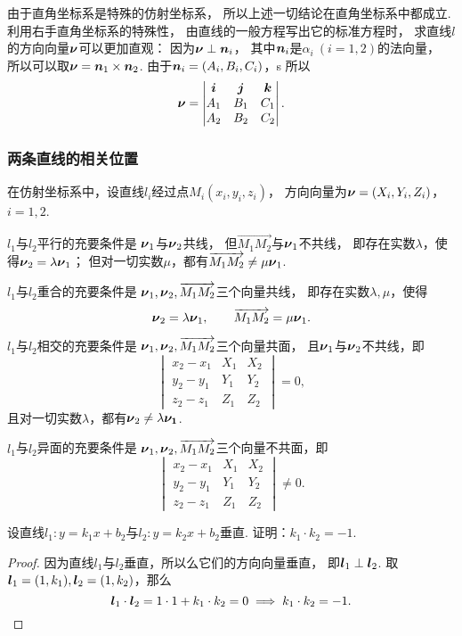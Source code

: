 由于直角坐标系是特殊的仿射坐标系，
所以上述一切结论在直角坐标系中都成立.
利用右手直角坐标系的特殊性，
由直线的一般方程写出它的标准方程时，
求直线\(l\)的方向向量\(\boldsymbol{\nu}\)可以更加直观：
因为\(\boldsymbol{\nu}\perp\boldsymbol{n}_i\)，
其中\(\boldsymbol{n}_i\)是\(\alpha_i\ (i=1,2)\)的法向量，
所以可以取\(\boldsymbol{\nu}=\boldsymbol{n}_1\times\boldsymbol{n}_2\).
由于\(\boldsymbol{n}_i = (A_i,B_i,C_i)\)，s
所以\[
	\boldsymbol{\nu}
	= \begin{vmatrix}
		\boldsymbol{i} & \boldsymbol{j} & \boldsymbol{k} \\
		A_1 & B_1 & C_1 \\
		A_2 & B_2 & C_2
	\end{vmatrix}.
\]

\subsubsection{两条直线的相关位置}
在仿射坐标系中，设直线\(l_i\)经过点\(M_i(x_i,y_i,z_i)\)，
方向向量为\(\boldsymbol{\nu}=(X_i,Y_i,Z_i)\)，\(i=1,2\).

\(l_1\)与\(l_2\)平行的充要条件是
\(\boldsymbol{\nu}_1\)与\(\boldsymbol{\nu}_2\)共线，
但\(\vec{M_1 M_2}\)与\(\boldsymbol{\nu}_1\)不共线，
即存在实数\(\lambda\)，使得\(\boldsymbol{\nu}_2 = \lambda \boldsymbol{\nu}_1\)；
但对一切实数\(\mu\)，都有\(\overrightarrow{M_1 M_2} \neq \mu \boldsymbol{\nu}_1\).

\(l_1\)与\(l_2\)重合的充要条件是
\(\boldsymbol{\nu}_1,\boldsymbol{\nu}_2,\overrightarrow{M_1 M_2}\)三个向量共线，
即存在实数\(\lambda,\mu\)，使得\[
	\boldsymbol{\nu}_2 = \lambda \boldsymbol{\nu}_1,
	\qquad
	\overrightarrow{M_1 M_2} = \mu \boldsymbol{\nu}_1.
\]

\(l_1\)与\(l_2\)相交的充要条件是
\(\boldsymbol{\nu}_1,\boldsymbol{\nu}_2,\overrightarrow{M_1 M_2}\)三个向量共面，
且\(\boldsymbol{\nu}_1\)与\(\boldsymbol{\nu}_2\)不共线，即\[
	\begin{vmatrix}
		x_2 - x_1 & X_1 & X_2 \\
		y_2 - y_1 & Y_1 & Y_2 \\
		z_2 - z_1 & Z_1 & Z_2
	\end{vmatrix} = 0,
\]
且对一切实数\(\lambda\)，都有\(\boldsymbol{\nu}_2 \neq \lambda \boldsymbol{\nu_1}\).

\(l_1\)与\(l_2\)异面的充要条件是
\(\boldsymbol{\nu}_1,\boldsymbol{\nu}_2,\overrightarrow{M_1 M_2}\)三个向量不共面，即\[
	\begin{vmatrix}
		x_2 - x_1 & X_1 & X_2 \\
		y_2 - y_1 & Y_1 & Y_2 \\
		z_2 - z_1 & Z_1 & Z_2
	\end{vmatrix} \neq 0.
\]

\begin{example}
设直线\(l_1: y=k_1 x+b_2\)与\(l_2: y=k_2 x+b_2\)垂直.
证明：\(k_1 \cdot k_2 = -1\).
\begin{proof}
因为直线\(l_1\)与\(l_2\)垂直，所以么它们的方向向量垂直，
即\(\boldsymbol{l}_1 \perp \boldsymbol{l}_2\).
取\(\boldsymbol{l}_1 = (1,k_1),\boldsymbol{l}_2 = (1,k_2)\)，那么\[
\boldsymbol{l}_1\cdot\boldsymbol{l}_2 = 1 \cdot 1 + k_1 \cdot k_2 = 0
\implies
k_1 \cdot k_2 = -1.
\qedhere
\]
\end{proof}
\end{example}

